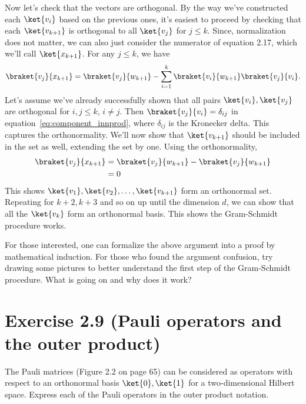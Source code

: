 \documentclass{book}
\begin{document}
    Now let's check that the vectors are orthogonal. By the way we've constructed each $\ket{v_i}$ based on the previous ones, it's easiest to proceed by checking that each $\ket{v_{k+1}}$ is orthogonal to all $\ket{v_j}$ for $j \leq k$. Since, normalization does not matter, we can also just consider the numerator of equation 2.17, which we'll call $\ket{x_{k+1}}$. For any $j \leq k$, we have
    \begin{align}\label{eq:component_innprod}
        \braket{v_j}{x_{k+1}} = \braket{v_j}{w_{k+1}} - \sum_{i=1}^k \braket{v_i}{w_{k+1}} \braket{v_j}{v_i}.
    \end{align}
    Let's assume we've already successfully shown that all pairs $\ket{v_i}, \ket{v_j}$ are orthogonal for $i,j \leq k$, $i\neq j$. Then $\braket{v_j}{v_i} = \delta_{ij}$ in equation~\eqref{eq:component_innprod}, where $\delta_{ij}$ is the Kronecker delta. This captures the orthonormality. We'll now show that $\ket{v_{k+1}}$ should be included in the set as well, extending the set by one. Using the orthonormality,
    \begin{align}
    \begin{aligned}
        \braket{v_j}{x_{k+1}} &= \braket{v_j}{w_{k+1}} - \braket{v_j}{w_{k+1}} \\
        &= 0 
    \end{aligned}
    \end{align}
    This shows $\ket{v_1}, \ket{v_2}, \dots, \ket{v_{k+1}}$ form an orthonormal set. Repeating for $k+2, k+3$ and so on up until the dimension $d$, we can show that all the $\ket{v_k}$ form an orthonormal basis. This shows the Gram-Schmidt procedure works.
    
    For those interested, one can formalize the above argument into a proof by mathematical induction. For those who found the argument confusion, try drawing some pictures to better understand the first step of the Gram-Schmidt procedure. What is going on and why does it work?
    
\section*{Exercise 2.9 (Pauli operators and the outer product)}
    The Pauli matrices (Figure 2.2 on page 65) can be considered as operators with respect to an orthonormal basis $\ket{0}, \ket{1}$ for a two-dimensional Hilbert space. Express each of the Pauli operators in the outer product notation.
    
\end{document}
